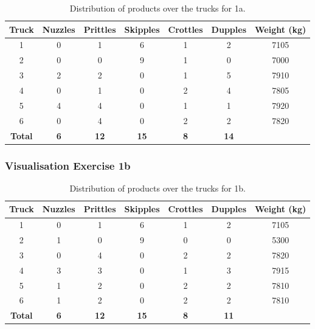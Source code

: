             \begin{table}[ht]
                \centering
                \label{tab:exercise1a}
                \begin{tabular}{c|ccccc|c}
                    \textbf{Truck} & \textbf{Nuzzles} & \textbf{Prittles} & 
                    \textbf{Skipples} & \textbf{Crottles} & \textbf{Dupples} &
                    \textbf{Weight (kg)} \\
                    \hline
                        1 & 0 & 1 & 6 & 1 & 2 & 7105 \\
                        2 & 0 & 0 & 9 & 1 & 0 & 7000 \\
                        3 & 2 & 2 & 0 & 1 & 5 & 7910 \\
                        4 & 0 & 1 & 0 & 2 & 4 & 7805 \\
                        5 & 4 & 4 & 0 & 1 & 1 & 7920 \\
                        6 & 0 & 4 & 0 & 2 & 2 & 7820 \\
                    \hline
                    \textbf{Total} & \textbf{6} & \textbf{12} & \textbf{15} &
                    \textbf{8} & \textbf{14} & \\
                \end{tabular}
                \caption{Distribution of products over the trucks for 1a.}
            \end{table}

        \subsubsection{Visualisation Exercise 1b}

            \begin{table}[ht]
                \centering
                \label{tab:exercise1b}
                \begin{tabular}{c|ccccc|c}
                    \textbf{Truck} & \textbf{Nuzzles} & \textbf{Prittles} & 
                    \textbf{Skipples} & \textbf{Crottles} & \textbf{Dupples} &
                    \textbf{Weight (kg)} \\
                    \hline
                        1 & 0 & 1 & 6 & 1 & 2 & 7105 \\
                        2 & 1 & 0 & 9 & 0 & 0 & 5300 \\
                        3 & 0 & 4 & 0 & 2 & 2 & 7820 \\
                        4 & 3 & 3 & 0 & 1 & 3 & 7915 \\
                        5 & 1 & 2 & 0 & 2 & 2 & 7810 \\
                        6 & 1 & 2 & 0 & 2 & 2 & 7810 \\
                    \hline
                    \textbf{Total} & \textbf{6} & \textbf{12} & \textbf{15} &
                    \textbf{8} & \textbf{11} & \\
                \end{tabular}
                \caption{Distribution of products over the trucks for 1b.}
            \end{table}

